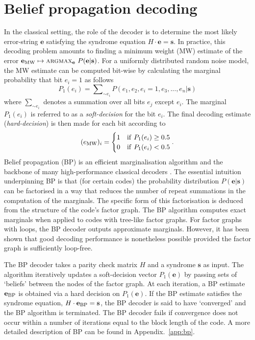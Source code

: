 \documentclass[%
 reprint,
superscriptaddress,
nofootinbib,
 amsmath,amssymb,
secnumarabic
]{revtex4-1}
\begin{document}
\section{Belief propagation decoding}\label{sec:bp}

In the classical setting, the role of the decoder is to determine the most likely error-string $\mathbf{e}$ satisfying the syndrome equation $H\cdot\mathbf{e}=\mathbf{s}$. In practice, this decoding problem amounts to finding a minimum weight (MW) estimate of the error $\mathbf{e}_{\rm MW} \mapsto \text{\sc{argmax}}_\mathbf{e} \ P(\mathbf{e}|\mathbf{s})$. For a uniformly distributed random noise model, the MW estimate can be computed bit-wise by calculating the marginal probability that bit $e_i=1$ as follows
%
\begin{equation} \label{eq:marginals}
P_1(e_i) = \sum\nolimits_{\sim e_i } P(e_1,e_2,e_i=1,e_3,...,e_n|\mathbf{s}) 
\end{equation} 
%
where $\sum\nolimits_{\sim e_i }$ denotes a summation over all bits $e_j$ except $e_i$. The marginal $P_1(e_i)$ is referred to as a \textit{soft-decision} for the bit $e_i$. The final decoding estimate (\textit{hard-decision}) is then made for each bit according to
%
\begin{equation}
(e_{\rm MW})_i=\begin{cases}
1 & {\rm if} \ P_1(e_i)\geq 0.5 \\
0 & {\rm if} \ P_1(e_i) < 0.5
\end{cases}\rm.
\end{equation} 
%
Belief propagation (BP) is an efficient marginalisation algorithm and the backbone of many high-performance classical decoders \cite{mackay1999good}. The essential intuition underpinning BP is that (for certain codes) the probability distribution $P(\mathbf{e}|\mathbf{s})$ can be factorised in a way that reduces the number of repeat summations in the computation of the marginals. The specific form of this factorisation is deduced from the structure of the code's factor graph. The BP algorithm computes exact marginals when applied to codes with tree-like factor graphs. For factor graphs with loops, the BP decoder outputs approximate marginals. However, it has been shown \cite{mackay1997near} that good decoding performance is nonetheless possible provided the factor graph is sufficiently loop-free.

The BP decoder takes a parity check matrix $H$ and a syndrome $\mathbf{s}$ as input. The algorithm iteratively updates a soft-decision vector $P_1(\mathbf{e})$ by passing sets of `beliefs' between the nodes of the factor graph. At each iteration, a BP estimate $\mathbf{e}_{\rm BP}$ is obtained via a hard decision on $P_1(\mathbf{e})$. If the BP estimate satisfies the syndrome equation, $H\cdot \mathbf{e}_{\rm BP}=\mathbf{s}$, the BP decoder is said to have `converged' and the BP algorithm is terminated. The BP decoder fails if convergence does not occur within a number of iterations equal to the block length of the code. A more detailed description of BP can be found in Appendix.~\ref{app:bp}.
\end{document}
